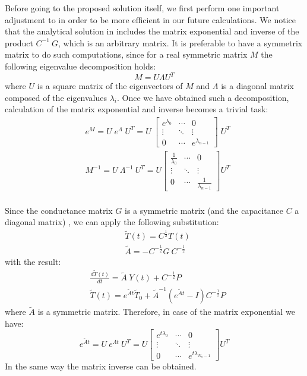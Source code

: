 Before going to the proposed solution itself, we first perform one important adjustment to  in order to be more efficient in our future calculations. We notice that the analytical solution in  includes the matrix exponential and inverse of the product $C^{-1} \: G$, which is an arbitrary matrix. It is preferable to have a symmetrix matrix to do such computations, since for a real symmetric matrix $M$ the following eigenvalue decomposition holds:
\begin{equation} \label{eq:eigenvalue-decomposition}
  M = U \Lambda U^T
\end{equation}
where $U$ is a square matrix of the eigenvectors of $M$ and $\Lambda$ is a diagonal matrix composed of the eigenvalues $\lambda_i$. Once we have obtained such a decomposition, calculation of the matrix exponential and inverse becomes a trivial task:
\begin{align*}
  & e^M = U \; e^{\Lambda} \; U^T = U \: \left[
      \begin{array}{ccc}
        e^{\lambda_0} & \cdots & 0 \\
        \vdots & \ddots & \vdots \\
        0 & \cdots & e^{\lambda_{n - 1}}
      \end{array}
    \right] \; U^T \\
  & M^{-1} = U \: \Lambda^{-1} \: U^T = U \left[
      \begin{array}{ccc}
        \frac{1}{\lambda_0} & \cdots & 0 \\
        \vdots & \ddots & \vdots \\
        0 & \cdots & \frac{1}{\lambda_{n - 1}}
      \end{array}
    \right] U^T \\
\end{align*}

Since the conductance matrix $G$ is a symmetric matrix (and the capacitance $C$ a diagonal matrix) \cite{rao2007}, we can apply the following substitution:
\begin{align*}
  & \tilde{T}(t) = C^{\frac{1}{2}} T(t) \\
  & \tilde{A} = -C^{-\frac{1}{2}} G \: C^{-\frac{1}{2}}
\end{align*}
with the result:
\begin{align*}
  & \frac{d\tilde{T}(t)}{dt} = \tilde{A} \: Y(t) + C^{-\frac{1}{2}} P \\
  & \tilde{T}(t) = e^{\tilde{A} t} \tilde{T}_0 + \tilde{A}^{-1} (e^{\tilde{A} t} - I) C^{-\frac{1}{2}} P
\end{align*}
where $\tilde{A}$ is a symmetric matrix. Therefore, in case of the matrix exponential we have:
\[
  e^{\tilde{A} t} = U \: e^{\Lambda t} \: U^T = U \left[
      \begin{array}{ccc}
        e^{t \lambda_0} & \cdots & 0 \\
        \vdots & \ddots & \vdots \\
        0 & \cdots & e^{t \lambda_{N_n - 1}}
      \end{array}
    \right] U^T
\]
In the same way the matrix inverse can be obtained.

